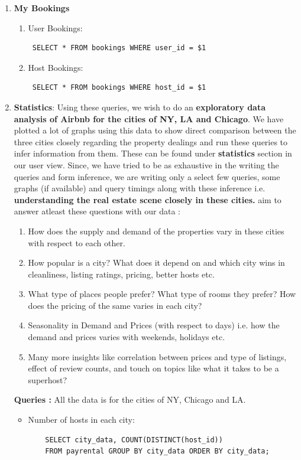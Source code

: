 \documentclass[10pt]{article}
\begin{document}
\begin{enumerate}
    \item \textbf{My Bookings}
    \begin{enumerate}
        \item User Bookings: \begin{verbatim} SELECT * FROM bookings WHERE user_id = $1 \end{verbatim}
        \item Host Bookings: \begin{verbatim} SELECT * FROM bookings WHERE host_id = $1 \end{verbatim}
    \end{enumerate}
    \item \textbf{Statistics}:
    Using these queries, we wish to do an \textbf{exploratory data analysis of Airbnb for the cities of NY, LA and Chicago}. We have plotted a lot of graphs using this data to show direct comparison between the three cities closely regarding the property dealings and run these queries to infer information from them. These can be found under \textbf{statistics} section in our user view. Since, we have tried to be as exhaustive in the writing the queries and form inference, we are writing only a select few queries, some graphs (if available) and query timings along with these inference i.e. \textbf{understanding the real estate scene closely in these cities.}
    \newline
    \We aim to answer atleast these questions with our data :
\begin{enumerate}
    \item How does the supply and demand of the properties vary in these cities with respect to each other. 
    \item How popular is a city? What does it depend on and which city wins in cleanliness, listing ratings, pricing, better hosts etc.
    \item What type of places people prefer? What type of rooms they prefer? How does the pricing of the same varies in each city? 
    \item Seasonality in Demand and Prices (with respect to days) i.e. how the demand and prices varies with weekends, holidays etc.
    \item Many more insights like correlation between prices and type of listings, effect of review counts, and touch on topics like what it takes to be a superhost?
\end{enumerate}
  \textbf{Queries :}
  All the data is for the cities of NY, Chicago and LA. 
  \begin{itemize}
    \item Number of hosts in each city:
    \begin{verbatim}
    SELECT city_data, COUNT(DISTINCT(host_id)) 
    FROM payrental GROUP BY city_data ORDER BY city_data;
    \end{verbatim}
    

\end{itemize}
\end{enumerate}
\end{document}
